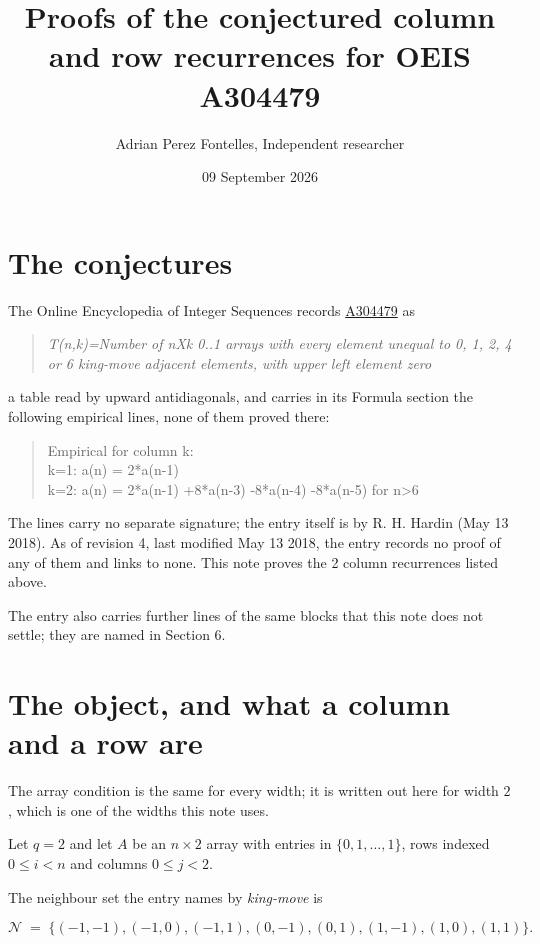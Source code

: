 \documentclass[11pt]{article}
\title{Proofs of the conjectured column and row recurrences for OEIS A304479}
\author{Adrian Perez Fontelles, Independent researcher}
\date{09 September 2026}
\theoremstyle{definition}
\begin{document}
\maketitle
\section{The conjectures}

The Online Encyclopedia of Integer Sequences records \href{https://oeis.org/A304479}{A304479} as

\begin{quote}\itshape T(n,k)=Number of nXk 0..1 arrays with every element unequal to 0, 1, 2, 4 or 6 king-move adjacent elements, with upper left element zero\end{quote}

a table read by upward antidiagonals, and carries in its Formula section the following empirical lines, none of them proved there:

\begin{quote}\ttfamily Empirical for column k:\\
k=1: a(n) = 2*a(n-1)\\k=2: a(n) = 2*a(n-1) +8*a(n-3) -8*a(n-4) -8*a(n-5) for n>6\end{quote}

The lines carry no separate signature; the entry itself is by R. H. Hardin (May 13 2018). As of revision 4, last modified May 13 2018, the entry records no proof of any of them and links to none. This note proves the 2 column recurrences listed above.

The entry also carries further lines of the same blocks that this note does not settle; they are named in Section 6.

\section{The object, and what a column and a row are}

The array condition is the same for every width; it is written out here for width $2$, which is one of the widths this note uses.

Let $q = 2$ and let $A$ be an $n \times 2$ array with entries in $\{0,1,\dots,1\}$, rows indexed $0 \le i < n$ and columns $0 \le j < 2$.

The neighbour set the entry names by {\itshape king-move} is

\[\mathcal{N} \;=\; \{(-1,-1), (-1,0), (-1,1), (0,-1), (0,1), (1,-1), (1,0), (1,1)\}.\]
\end{document}
